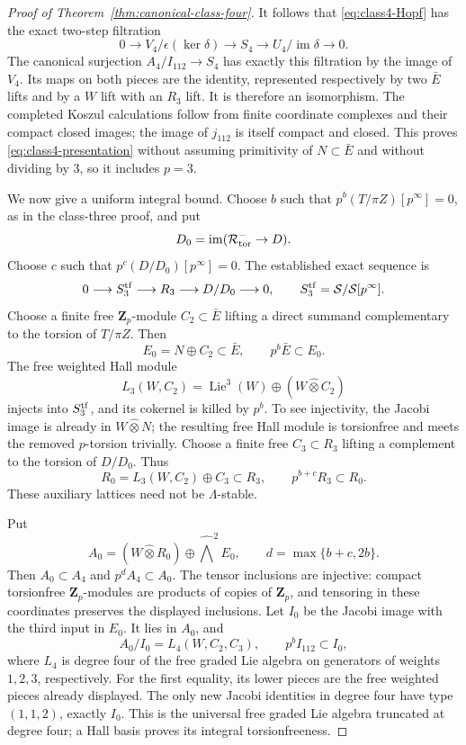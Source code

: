 \documentclass[11pt]{article}
\theoremstyle{definition}\newtheorem{definition}[theorem]{Definition}
\begin{document}
\begin{proof}[Proof of Theorem~\ref{thm:canonical-class-four}]
It follows that \eqref{eq:class4-Hopf} has the exact
two-step filtration
\[
 0\longrightarrow V_4/\epsilon(\ker\delta)
 \longrightarrow S_4
 \longrightarrow U_4/\operatorname{im}\delta
 \longrightarrow0.
\]
The canonical surjection $A_4/I_{112}\to S_4$ has
exactly this filtration by the image of $V_4$.
Its maps on both pieces are the identity, represented
respectively by two $\bar E$ lifts and by a $W$ lift
with an $R_3$ lift. It is therefore an isomorphism.
The completed Koszul calculations follow from finite
coordinate complexes and their compact closed images;
the image of $j_{112}$ is itself compact and closed.
This proves \eqref{eq:class4-presentation} without
assuming primitivity of $N\subset\bar E$ and without
dividing by $3$, so it includes $p=3$.

We now give a uniform integral bound. Choose $b$ such
that $p^b(T/\pi Z)[p^\infty]=0$, as in the class-three
proof, and put
\[
 D_0=\operatorname{im}(\mathcal R_{\rm tor}^-\to D).
\]
Choose $c$ such that $p^c(D/D_0)[p^\infty]=0$.
The established exact sequence is
\[
 0\longrightarrow S_3^{\rm tf}\longrightarrow R_3
 \longrightarrow D/D_0\longrightarrow0,
 \qquad S_3^{\rm tf}=\mathcal S/\mathcal S[p^\infty].
\]
Choose a finite free $\mathbf Z_p$-module $C_2\subset\bar E$
lifting a direct summand complementary to the torsion
of $T/\pi Z$. Then
\[
 E_0=N\oplus C_2\subset\bar E,\qquad p^b\bar E\subset E_0.
\]
The free weighted Hall module
\[
 L_3(W,C_2)=\operatorname{Lie}^3(W)
                      \oplus(W\widehat\otimes C_2)
\]
injects into $S_3^{\rm tf}$, and its cokernel is killed
by $p^b$. To see injectivity, the Jacobi image is already
in $W\widehat\otimes N$; the resulting free Hall module
is torsionfree and meets the removed $p$-torsion trivially.
Choose a finite free $C_3\subset R_3$ lifting a complement
to the torsion of $D/D_0$. Thus
\[
 R_0=L_3(W,C_2)\oplus C_3\subset R_3,
 \qquad p^{b+c}R_3\subset R_0.
\]
These auxiliary lattices need not be $\Lambda$-stable.

Put
\[
 A_0=(W\widehat\otimes R_0)\oplus
                          \widehat\bigwedge^2E_0,
 \qquad d=\max\{b+c,2b\}.
\]
Then $A_0\subset A_4$ and $p^dA_4\subset A_0$.
The tensor inclusions are injective: compact torsionfree
$\mathbf Z_p$-modules are products of copies of
$\mathbf Z_p$, and tensoring in these coordinates
preserves the displayed inclusions. Let $I_0$ be the
Jacobi image with the third input in $E_0$. It lies in
$A_0$, and
\[
 A_0/I_0=L_4(W,C_2,C_3),\qquad p^bI_{112}\subset I_0,
\]
where $L_4$ is degree four of the free graded Lie algebra
on generators of weights $1,2,3$, respectively.
For the first equality, its lower pieces are the free
weighted pieces already displayed. The only new Jacobi
identities in degree four have type $(1,1,2)$, exactly
$I_0$. This is the universal free graded Lie algebra
truncated at degree four; a Hall basis proves its
integral torsionfreeness.


\end{proof}
\end{document}
